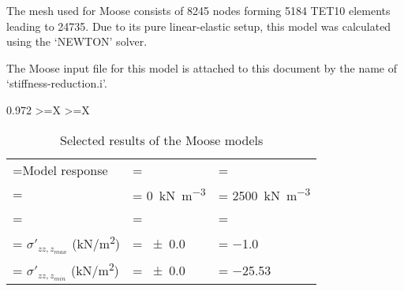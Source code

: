 The mesh used for Moose consists of \qty{8245}{} nodes forming \qty{5184}{}
TET10 elements leading to \qty{24735}{\DOF}. Due to its pure linear-elastic
setup, this model was calculated using the ‘NEWTON’ solver.

The Moose input file for this model is attached to this document by the name of
‘stiffness-reduction.i’.


\begin{table}[htbp]
    \centering
    \caption{Selected results of the Moose models}
    \label{fully-saturated-undrained-compression:moose-results}

    \begin{tabularx}{0.972\hsize}{
            >{\hsize\linewidth=\hsize}X
            >{\hsize\linewidth=\hsize}X}
        {\begin{tabularx}{1\linewidth}{
                     >{\hsize\linewidth=\hsize}X
                     >{\hsize\linewidth=\hsize\hspace{-5pt}}Y
                     >{\hsize\linewidth=\hsize\hspace{-5pt}}Y}
                 \toprule
                 Model response                                                                                &                                                                                    \\
                 {}                                                                                            & \qty[per-mode = symbol]{0}{\kilo\newton\per\cubic\metre} & \qty[per-mode = symbol]{2500}{\kilo\newton\per\cubic\metre} \\
                 \midrule

                                                                                                                                                                                                 \\
                 \hspace{1em} $\sigma'_{zz,z_{max}}$ (\unit[per-mode = symbol]{\kilo\newton\per\square\metre}) & \qty{\pm0.0}{}                                           & \qty{-1.0}{}                                                \\
                 \hspace{1em} $\sigma'_{zz,z_{min}}$ (\unit[per-mode = symbol]{\kilo\newton\per\square\metre}) & \qty{\pm0.0}{}                                           & \qty{-25.53}{}                                              \\


\end{tabularx}}
\end{tabularx}
\end{table}
